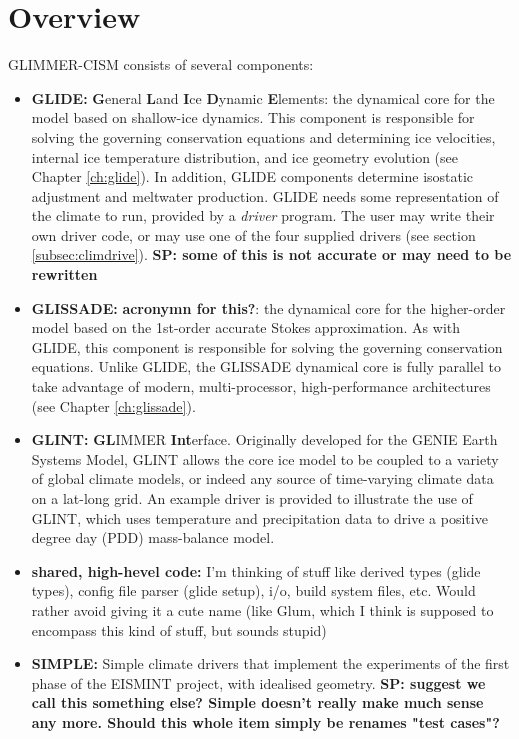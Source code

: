 \section{Overview}
%
GLIMMER-CISM consists of several components:
%
\begin{itemize}
\item {\bf GLIDE:} {\bf G}eneral {\bf L}and {\bf I}ce {\bf D}ynamic {\bf E}lements: the dynamical core for the model based on shallow-ice dynamics. This component is responsible for solving the governing conservation equations and determining ice velocities, internal ice temperature distribution, and ice geometry evolution (see Chapter \ref{ch:glide}). In addition, GLIDE components determine isostatic adjustment and meltwater production. GLIDE needs some representation of the climate to run, provided by a {\it driver} program. The user may write their own driver code, or may use one of the four supplied drivers (see section \ref{subsec:climdrive}). \textbf{SP: some of this is not accurate or may need to be rewritten}
\item {\bf GLISSADE:} {\bf acronymn for this?}: the dynamical core for the higher-order model based on the 1st-order accurate Stokes approximation. As with GLIDE, this component is responsible for solving the governing conservation equations. Unlike GLIDE, the GLISSADE dynamical core is fully parallel to take advantage of modern, multi-processor, high-performance architectures  (see Chapter \ref{ch:glissade}).
\item {\bf GLINT:} {\bf GL}IMMER {\bf Int}erface. Originally developed for the GENIE %
Earth Systems Model, GLINT allows the core ice model to be coupled to a variety of global climate models, or indeed any source of time-varying climate data on a lat-long grid. An example driver is provided to illustrate the use of GLINT, which uses temperature and precipitation data to drive a positive degree day (PDD) mass-balance model.
\item {\bf shared, high-hevel code:} I'm thinking of stuff like derived types (glide types), config file parser (glide setup), i/o, build system files, etc. Would rather avoid giving it a cute name (like Glum, which I think is supposed to encompass this kind of stuff, but sounds stupid)
\item {\bf SIMPLE:} Simple climate drivers that implement the experiments of the first phase of the EISMINT project, with idealised geometry. \textbf{SP: suggest we call this something else? Simple doesn't really make much sense any more. Should this whole item simply be renames "test cases"?}

\end{itemize}
